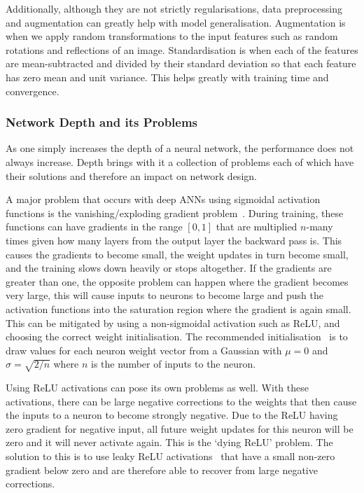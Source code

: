 Additionally, although they are not strictly regularisations, data preprocessing and augmentation can greatly help with model generalisation. Augmentation is when we apply random transformations to the input features such as random rotations and reflections of an image. Standardisation is when each of the features are mean-subtracted and divided by their standard deviation so that each feature has zero mean and unit variance. This helps greatly with training time and convergence. 


\subsubsection{Network Depth and its Problems}
As one simply increases the depth of a neural network, the performance does not always increase. Depth brings with it a collection of problems each of which have their solutions and therefore an impact on network design. 

A major problem that occurs with deep ANNs using sigmoidal activation functions is the vanishing/exploding gradient problem~\cite{VanishingGradient}. During training, these functions can have gradients in the range $[0,1]$ that are multiplied $n$-many times given how many layers from the output layer the backward pass is. This causes the gradients to become small, the weight updates in turn become small, and the training slows down heavily or stops altogether. If the gradients are greater than one, the opposite problem can happen where the gradient becomes very large, this will cause inputs to neurons to become large and push the activation functions into the saturation region where the gradient is again small. 
This can be mitigated by using a non-sigmoidal activation such as ReLU, and choosing the correct weight initialisation. The recommended initialisation~\cite{CS231n,HeEtAl} is to draw values for each neuron weight vector from a Gaussian with $\mu=0$ and $\sigma=\sqrt{2/n}$ where $n$ is the number of inputs to the neuron.

Using ReLU activations can pose its own problems as well. With these activations, there can be large negative corrections to the weights that then cause the inputs to a neuron to become strongly negative. 
Due to the ReLU having zero gradient for negative input, all future weight updates for this neuron will be zero and it will never activate again. This is the `dying ReLU' problem.
The solution to this is to use leaky ReLU activations~\cite{LeakyRelu} that have a small non-zero gradient below zero and are therefore able to recover from large negative corrections. 


